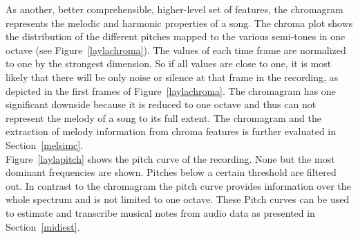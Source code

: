 As another, better comprehensible, higher-level set of features, the chromagram represents the melodic and harmonic properties of a song. The chroma plot shows the distribution of the different pitches mapped to the various semi-tones in one octave (see Figure~\ref{laylachroma}). The values of each time frame are normalized to one by the strongest dimension. So if all values are close to one, it is most likely that there will be only noise or silence at that frame in the recording, as depicted in the first frames of Figure~\ref{laylachroma}. The chromagram has one significant downside because it is reduced to one octave and thus can not represent the melody of a song to its full extent. The chromagram and the extraction of melody information from chroma features is further evaluated in Section~\ref{melsimc}.\\
Figure~\ref{laylapitch} shows the pitch curve of the recording. None but the most dominant frequencies are shown. Pitches below a certain threshold are filtered out. In contrast to the chromagram the pitch curve provides information over the whole spectrum and is not limited to one octave. These Pitch curves can be used to estimate and transcribe musical notes from audio data as presented in Section~\ref{midiest}.\\

